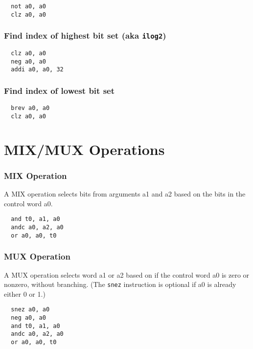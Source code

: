\begin{verbatim}
  not a0, a0
  clz a0, a0
\end{verbatim}

\subsubsection{Find index of highest bit set (aka \texttt{ilog2})}

\begin{verbatim}
  clz a0, a0
  neg a0, a0
  addi a0, a0, 32
\end{verbatim}

\subsubsection{Find index of lowest bit set}

\begin{verbatim}
  brev a0, a0
  clz a0, a0
\end{verbatim}

\section{MIX/MUX Operations}

\subsubsection{MIX Operation}

A MIX operation selects bits from arguments a1 and a2 based on the bits in
the control word a0.

\begin{verbatim}
  and t0, a1, a0
  andc a0, a2, a0
  or a0, a0, t0
\end{verbatim}

\subsubsection{MUX Operation}

A MUX operation selects word a1 or a2 based on if the control word a0 is
zero or nonzero, without branching. (The {\tt snez} instruction is optional
if a0 is already either 0 or 1.)

\begin{verbatim}
  snez a0, a0
  neg a0, a0
  and t0, a1, a0
  andc a0, a2, a0
  or a0, a0, t0
\end{verbatim}

